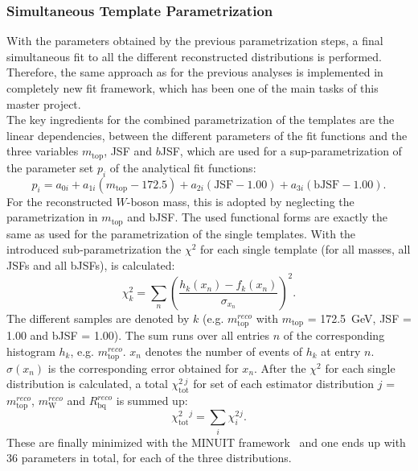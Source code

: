 {{


\subsubsection{Simultaneous Template Parametrization }

With the parameters obtained by the previous parametrization steps, a final simultaneous fit to all the different reconstructed distributions is performed. Therefore, the same approach as for the previous analyses is implemented in completely new  fit framework, which has been one of the main tasks of this master project.\\


\noindent The key ingredients for the combined parametrization of the templates are the linear dependencies, between the different parameters of the fit functions and the three variables $m_{\text{top}}$, JSF and $b$JSF, which are used  for a sup-parametrization of the parameter set  $p_i$ of the analytical fit functions:
\begin{equation}\label{eq:lin}
p_i = a_{0i} + a_{1i}(m_{\text{top}}-172.5) + a_{2i}(\text{JSF}-1.00) + a_{3i}(\text{bJSF}-1.00) .
\end{equation}
For the reconstructed $W$-boson mass, this  is adopted by neglecting the parametrization in  $m_{\text{top}}$ and bJSF. The used functional forms are exactly the same as used for the parametrization of the single templates.  With the introduced sub-parametrization  the $\chi^2$ for each single template (for all masses, all JSFs and all bJSFs), is calculated:
\begin{equation}
\chi^2_k = \sum_{n} \left( \frac{h_{k}(x_n)-f_{k}(x_n)}{\sigma_{x_n}}\right)^2.
\end{equation}
The different samples are denoted by $k$ (e.g. $m_{\text{top}}^{reco}$ with $m_{\text{top}}$ = 172.5~GeV, JSF = 1.00 and bJSF = 1.00). The sum runs over all entries $n$ of the corresponding histogram $h_k$, e.g. $m_{\text{top}}^{reco}$. $x_n$ denotes the number of events of $h_k$ at entry $n$. $\sigma(x_n)$ is the corresponding error obtained for $x_n$.  After the $\chi^2$ for each single distribution is calculated, a total $\chi^{2~j}_{\text{tot}}$ for set of each estimator distribution  $j$ = $m_{\text{top}}^{reco}$, $m_{\text{W}}^{reco}$ and $R_{\text{bq}}^{reco}$ is summed up:
\begin{equation}
\chi^2_{\text{tot}}^{j} = \sum_{i}  \chi^2_{i}^{j}.
\end{equation} 
These  are finally minimized with the \textsc{MINUIT} framework~\cite{James:2004xla} and one ends up with 36 parameters in total, for each of the three distributions.\\




}}
